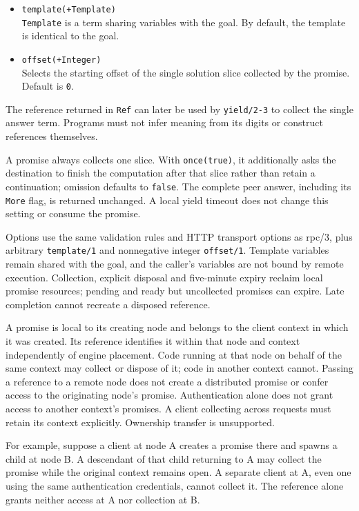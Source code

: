 \begin{itemize}
\item
  \texttt{template(\allowbreak{}+Template)}\\
  \texttt{Template} is a term sharing variables with the goal. By default, the
  template is identical to the goal.
\item
  \texttt{offset(\allowbreak{}+Integer)}\\
  Selects the starting offset of the single solution slice collected by the
  promise. Default is \texttt{0}.
\end{itemize}

The reference returned in \texttt{Ref} can later be used by \texttt{yield/\allowbreak{}2-3} to collect the single
answer term. Programs must not infer meaning from its digits or construct references themselves.

A promise always collects one slice. With \texttt{once(true)}, it additionally
asks the destination to finish the computation after that slice rather than
retain a continuation; omission defaults to \texttt{false}. The complete peer
answer, including its \texttt{More} flag, is returned unchanged. A local yield
timeout does not change this setting or consume the promise.

Options use the same validation rules and HTTP transport options as rpc/3, plus arbitrary
\texttt{template/\allowbreak{}1} and nonnegative integer \texttt{offset/\allowbreak{}1}. Template variables remain shared with
the goal, and the caller's variables are not bound by remote execution. Collection, explicit
disposal and five-minute expiry reclaim local promise resources; pending and ready but uncollected
promises can expire. Late completion cannot recreate a disposed reference.

A promise is local to its creating node and belongs to the client context
in which it was created. Its reference identifies it within that node and
context independently of engine placement. Code running at that node on
behalf of the same context may collect or dispose of it; code in another
context cannot. Passing a reference to a remote node does not create a
distributed promise or confer access to the originating node's promise. Authentication alone does not grant access
to another context's promises. A client collecting across requests must retain
its context explicitly. Ownership transfer is unsupported.

For example, suppose a client at node A creates a promise there and spawns a
child at node B. A descendant of that child returning to A may collect the
promise while the original context remains open. A separate client at A,
even one using the same authentication credentials, cannot collect it.
The reference alone grants neither access at A nor collection at B.

